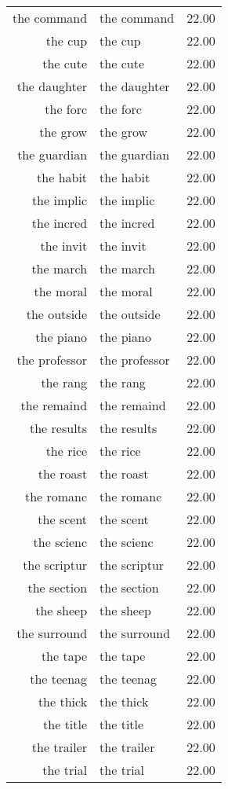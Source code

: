 \begin{table}[ht]
\begin{tabular}{rlr}
  the command & the command & 22.00 \\ 
  the cup & the cup & 22.00 \\ 
  the cute & the cute & 22.00 \\ 
  the daughter & the daughter & 22.00 \\ 
  the forc & the forc & 22.00 \\ 
  the grow & the grow & 22.00 \\ 
  the guardian & the guardian & 22.00 \\ 
  the habit & the habit & 22.00 \\ 
  the implic & the implic & 22.00 \\ 
  the incred & the incred & 22.00 \\ 
  the invit & the invit & 22.00 \\ 
  the march & the march & 22.00 \\ 
  the moral & the moral & 22.00 \\ 
  the outside & the outside & 22.00 \\ 
  the piano & the piano & 22.00 \\ 
  the professor & the professor & 22.00 \\ 
  the rang & the rang & 22.00 \\ 
  the remaind & the remaind & 22.00 \\ 
  the results & the results & 22.00 \\ 
  the rice & the rice & 22.00 \\ 
  the roast & the roast & 22.00 \\ 
  the romanc & the romanc & 22.00 \\ 
  the scent & the scent & 22.00 \\ 
  the scienc & the scienc & 22.00 \\ 
  the scriptur & the scriptur & 22.00 \\ 
  the section & the section & 22.00 \\ 
  the sheep & the sheep & 22.00 \\ 
  the surround & the surround & 22.00 \\ 
  the tape & the tape & 22.00 \\ 
  the teenag & the teenag & 22.00 \\ 
  the thick & the thick & 22.00 \\ 
  the title & the title & 22.00 \\ 
  the trailer & the trailer & 22.00 \\ 
  the trial & the trial & 22.00 \\ 

\end{tabular}
\end{table}

